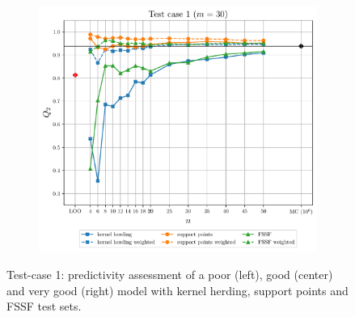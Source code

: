 \begin{landscape}
\begin{figure}
\begin{subfigure}[b]{0.32\linewidth}
        \end{subfigure}
        \centering
        \begin{subfigure}[b]{0.32\linewidth}
            \centering
            \includegraphics[width=\linewidth]{./part2/figures/SIS/irregular_learnsize_30.pdf}
        \end{subfigure}
        \caption{Test-case 1: predictivity assessment of a poor (left), good (center) and very good (right) model with kernel herding, support points and FSSF test sets.}
        \label{fig:irregular_benchmark}
    \end{figure}


\end{landscape}
